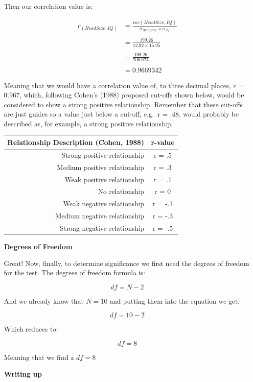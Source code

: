 \documentclass[
  oneside]{book}
\begin{document}
Then our correlation value is:

\begin{align*}
r_{(HeadSize,IQ)} &= \frac{cov(HeadSize,IQ)}{\sigma_{HeadSize}\times\sigma_{IQ}} \\ \\ &= \frac{199.26}{12.92 \times 15.95} \\ \\ &= \frac{199.26}{206.074} \\ \\ &= 0.9669342
\end{align*}

Meaning that we would have a correlation value of, to three decimal places, \(r\) = 0.967, which, following Cohen's (1988) proposed cut-offs shown below, would be considered to show a strong positive relationship. Remember that these cut-offs are just guides so a value just below a cut-off, e.g.~r = .48, would probably be described as, for example, a strong positive relationship.

\begin{longtable}[]{@{}rc@{}}
\toprule
Relationship Description (Cohen, 1988) & r-value \\
\midrule
\endhead
Strong positive relationship & r = .5 \\
Medium positive relationship & r = .3 \\
Weak positive relationship & r = .1 \\
No relationship & r = 0 \\
Weak negative relationship & r = -.1 \\
Medium negative relationship & r = -.3 \\
Strong negative relationship & r = -.5 \\
\bottomrule
\end{longtable}

\textbf{Degrees of Freedom}

Great! Now, finally, to determine significance we first need the degrees of freedom for the test. The degrees of freedom formula is:

\[df = N - 2\]

And we already know that \(N= 10\) and putting them into the equation we get:

\[df = 10 - 2\]

Which reduces to:

\[df = 8\]

Meaning that we find a \(df = 8\)

\textbf{Writing up}
\end{document}
